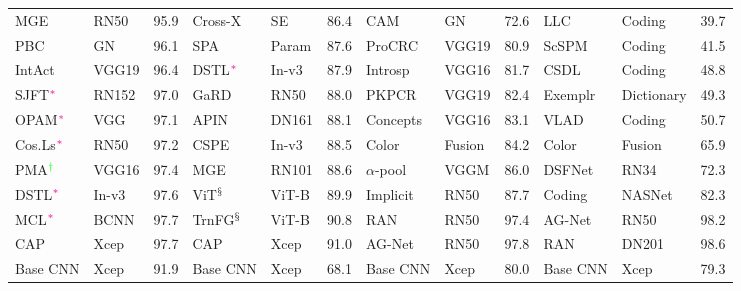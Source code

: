 \documentclass[journal]{IEEEtran}
\begin{document}
\begin{table*}[t]
\begin{small}
\begin{tabular}{|p{1.7 cm} p{8 mm} p{5 mm}|p{1.7 cm} p{8 mm} p{5 mm}|p{1.8 cm} p{8 mm} p{5 mm}|p{1.9 cm} p{13 mm} p{5 mm}|}
      \hline 
 MGE\cite {zhang2019learning} & RN50  & 95.9 &
 Cross-X \cite {luo2019cross} & SE  & 86.4 & 
  CAM  \cite{zhou2016learning} & GN &72.6 & 
  LLC \cite{wang2010locality} & Coding & 39.7 \\
  PBC \cite{huang2016pbc} & GN & 96.1 & 
  SPA \cite{ali2019parametric} & Param  &87.6  &
  ProCRC \cite{cai2016probabilistic} & VGG19 & 80.9 & 
  ScSPM \cite{yang2009linear} & Coding  & 41.5\\
IntAct \cite {xie2016interactive} & VGG19   & 96.4 & DSTL$^{\color{magenta}*}$  \cite{cui2018large} & In-v3 &87.9 & 
Introsp \cite{rosenfeld2016visual} &VGG16 & 81.7 & 
CSDL \cite{gao2013learning} & Coding  & 48.8  \\
SJFT$^{\color{magenta}*}$  \cite{ge2017borrowing} & RN152  & 97.0 & GaRD\cite{zhao2021graph} & RN50 & 88.0  & 
PKPCR \cite{lan2018prior} & VGG19 & 82.4 & 
Exemplr \cite{Hu2013recognising} &  Dictionary  &49.3 \\
OPAM$^{\color{magenta}*}$  \cite{peng2017object} & VGG  & 97.1 & 
  APIN \cite{zhuang2020learning}  &DN161  &88.1  & 
Concepts  \cite{RosenfeldU16b} & VGG16 & 83.1 & 
VLAD \cite{zhang2016towards} & Coding  &50.7  \\
Cos.Ls$^{\color{magenta}*}$\cite{barz2020deep} & RN50 &	97.2 & CSPE \cite {korsch2019classification} & In-v3   & 88.5 & 
Color  \cite{lavinia2020new} & Fusion &84.2 &  
Color \cite{lavinia2020new} & Fusion &65.9 \\ 
PMA$^{\color{green}\dagger}$  \cite{song2020bi} & VGG16 &97.4  & MGE \cite{zhang2019learning} & RN101  &88.6 & 
$\alpha$-pool \cite{simon2017generalized} & VGGM &86.0 & 
DSFNet \cite{li2020deep} & RN34  &72.3 \\
DSTL$^{\color{magenta}*}$  \cite{cui2018large} & In-v3  & 97.6  & 
ViT{\color{orange}$^\mathsection$} \cite{dosovitskiy2020image} & ViT-B &	89.9 & Implicit \cite{simon2018whole} & RN50 & 87.7 & 
Coding \cite{li2018reassessing} &  NASNet & 82.3  \\
MCL$^{\color{magenta}*}$ \cite{chang2020devil} & BCNN  &97.7 &  
TrnFG{\color{orange}$^\mathsection$}\cite{he2021transfg} & ViT-B  & 90.8 &  RAN \cite{behera2020regional} & RN50 &97.4 & 
 AG-Net \cite{bera2021attend} & RN50 & 98.2 \\
CAP \cite{behera2021context} &Xcep  &97.7 & CAP \cite{behera2021context} &Xcep &91.0 & AG-Net \cite{bera2021attend} & RN50 &97.8 & RAN \cite{behera2020regional} & DN201 & 98.6\\
         \hline
 Base CNN & Xcep & 91.9 &   Base CNN & Xcep& 68.1 & Base CNN &Xcep  &  80.0 & Base CNN  & Xcep & 79.3\\

\end{tabular}
\end{small}
\end{table*}
\end{document}
